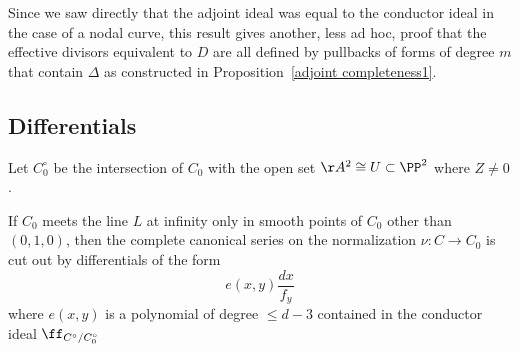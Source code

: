 Since we saw directly that the adjoint ideal was equal to the conductor ideal in the case of
a nodal curve, this result gives another, less ad hoc, proof that the effective divisors equivalent to $D$
are all defined by
pullbacks of forms of degree $m$ that contain $\Delta$
as constructed in Proposition~\ref{adjoint completeness1}.

\subsection{Differentials}

Let $C^\circ_0$ be the intersection of $C_0$ with the open set $\AA^{2}\cong U\subset \PP^{2}$ where $Z \neq 0$.

\begin{theorem}\label{general differentials}
If $C_{0}$ meets the line $L$ at infinity only in smooth points of $C_{0}$ other than $(0,1,0)$, then the complete canonical series on the normalization $\nu: C \to C_{0}$ is cut out by differentials of the form
$$
e(x,y) \frac{dx}{f_{y}}
$$
where $e(x,y)$ is a polynomial of degree $\leq d-3$ contained in the 
conductor ideal $\ff_{C^{\circ}/C_{0}^{\circ}}$
\end{theorem}

